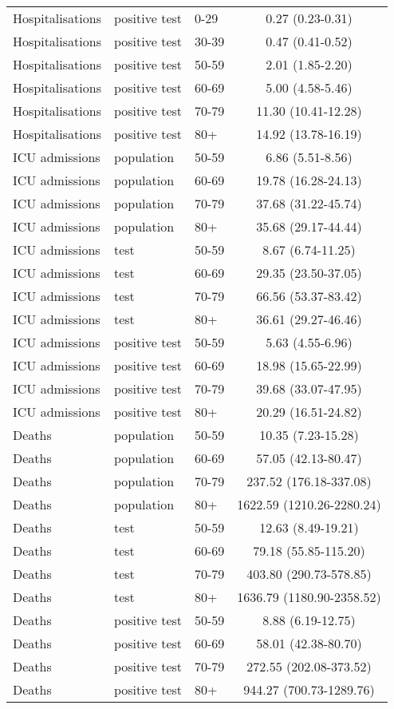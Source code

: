 \documentclass{article}
\begin{document}
\begin{longtable}{lllc}
			Hospitalisations & positive test & 0-29 & 0.27 (0.23-0.31) \\ 
			Hospitalisations & positive test & 30-39 & 0.47 (0.41-0.52) \\ 
			Hospitalisations & positive test & 50-59 & 2.01 (1.85-2.20) \\ 
			Hospitalisations & positive test & 60-69 & 5.00 (4.58-5.46) \\ 
			Hospitalisations & positive test & 70-79 & 11.30 (10.41-12.28) \\ 
			Hospitalisations & positive test & 80+ & 14.92 (13.78-16.19) \\ 
			ICU admissions & population & 50-59 & 6.86 (5.51-8.56) \\ 
			ICU admissions & population & 60-69 & 19.78 (16.28-24.13) \\ 
			ICU admissions & population & 70-79 & 37.68 (31.22-45.74) \\ 
			ICU admissions & population & 80+ & 35.68 (29.17-44.44) \\ 
			ICU admissions & test & 50-59 & 8.67 (6.74-11.25) \\ 
			ICU admissions & test & 60-69 & 29.35 (23.50-37.05) \\ 
			ICU admissions & test & 70-79 & 66.56 (53.37-83.42) \\ 
			ICU admissions & test & 80+ & 36.61 (29.27-46.46) \\ 
			ICU admissions & positive test & 50-59 & 5.63 (4.55-6.96) \\ 
			ICU admissions & positive test & 60-69 & 18.98 (15.65-22.99) \\ 
			ICU admissions & positive test & 70-79 & 39.68 (33.07-47.95) \\ 
			ICU admissions & positive test & 80+ & 20.29 (16.51-24.82) \\ 
			Deaths & population & 50-59 & 10.35 (7.23-15.28) \\ 
			Deaths & population & 60-69 & 57.05 (42.13-80.47) \\ 
			Deaths & population & 70-79 & 237.52 (176.18-337.08) \\ 
			Deaths & population & 80+ & 1622.59 (1210.26-2280.24) \\ 
			Deaths & test & 50-59 & 12.63 (8.49-19.21) \\ 
			Deaths & test & 60-69 & 79.18 (55.85-115.20) \\ 
			Deaths & test & 70-79 & 403.80 (290.73-578.85) \\ 
			Deaths & test & 80+ & 1636.79 (1180.90-2358.52) \\ 
			Deaths & positive test & 50-59 & 8.88 (6.19-12.75) \\ 
			Deaths & positive test & 60-69 & 58.01 (42.38-80.70) \\ 
			Deaths & positive test & 70-79 & 272.55 (202.08-373.52) \\ 
			Deaths & positive test & 80+ & 944.27 (700.73-1289.76) \\ 
			\hline
		\end{longtable}
	
\end{document}
